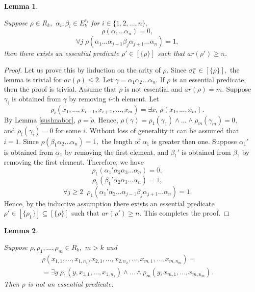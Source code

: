 \documentclass{au}
\theoremstyle{plain}
\newtheorem{lemma}{Lemma}
\theoremstyle{definition}
\theoremstyle{remark}
\numberwithin{equation}{section}
\begin{document}
\begin{lemma}\label{arnostSush}

Suppose $\rho\in R_{k},$ $\alpha_{i},\beta_{i}\in E_{k}^{s_{i}}$ for $i\in \{1,2,\ldots,n\},$
$$\rho(\alpha_{1}\ldots\alpha_{n}) = 0,$$
$$\forall j \; \rho(\alpha_{1}\ldots\alpha_{j-1}\beta_{j}\alpha_{j+1}\ldots\alpha_{n}) =1,$$
then there exists an essential predicate $\rho' \in [\{\rho\}]$
such that $ar(\rho') \ge n.$

\end{lemma}

\begin{proof}

Let us prove this by induction on the arity of $\rho.$
Since $\sigma_{k}^{=}\in [\{\rho\}],$ the lemma is trivial for $ar(\rho)\le 2$.
Let $\gamma = \alpha_{1}\alpha_{2}\ldots\alpha_{n}.$
If $\rho$ is an essential predicate, then the proof is trivial. 
Assume that $\rho$ is not essential and $ar(\rho) = m.$
Suppose $\gamma_{i}$ is obtained from $\gamma$ by removing $i$-th element.
Let $$\rho_{i}(x_{1},\ldots,x_{i-1},x_{i+1},\ldots,x_{m}) = \exists x_{i} \; \rho(x_{1},\ldots,x_{m}).$$
By Lemma \ref{sushnabor},
$\rho = \widetilde\rho.$
Hence, $\rho(\gamma) = \rho_{1}(\gamma_{1})\wedge \ldots
\wedge \rho_{m}(\gamma_{m})=0,$
and $\rho_{i}(\gamma_{i}) = 0$ for some $i.$
Without loss of generality it can be assumed that
$i=1.$
Since $\rho(\beta_{1}\alpha_{2}\ldots\alpha_{n}) = 1,$
the length of $\alpha_{1}$ is greater then one.
Suppose $\alpha_{1}'$ is obtained from $\alpha_{1}$ by removing the first element,
and $\beta_{1}'$ is obtained from $\beta_{1}$ by removing the first element.
Therefore, we have
$$\rho_{1}(\alpha_{1}'\alpha_{2}\alpha_{3}\ldots\alpha_{n}) = 0,$$
$$\rho_{1}(\beta_{1}'\alpha_{2}\alpha_{3}\ldots\alpha_{n}) =1,$$
$$\forall j\ge 2 \;\; \rho_{1}(\alpha_{1}'\alpha_{2}\ldots\alpha_{j-1}\beta_{j}\alpha_{j+1}\ldots\alpha_{n}) =1.$$
Hence, by the inductive assumption
there exists an essential predicate $\rho' \in [\{\rho_{1}\}]\subseteq [\{\rho\}]$
such that $ar(\rho') \ge n.$ This completes the proof.

\end{proof}

\begin{lemma}\label{nebolshek}

Suppose $\rho,\rho_{1},\ldots,\rho_{m}\in R_{k},$ $m>k$ and
\begin{multline*}
\rho(x_{1,1},\ldots,x_{1,n_{1}},x_{2,1},\ldots,x_{2,n_{2}},\ldots,x_{m,1},\ldots,x_{m,n_{m}}) = \\ =
\exists y \; \rho_{1}(y,x_{1,1},\ldots,x_{1,n_{1}})\wedge
\ldots \wedge \rho_{m}(y,x_{m,1},\ldots,x_{m,n_{m}}).
\end{multline*}
Then $\rho$ is not an essential predicate.

\end{lemma}
\end{document}
